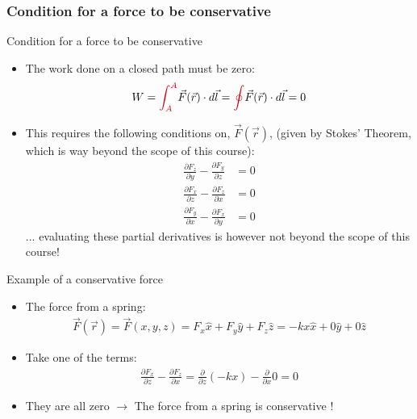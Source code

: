 \documentclass[aspectratio=169,
hyperref={colorlinks,urlcolor=blue}
]{beamer}
\begin{document}


\subsubsection{Condition for a force to be conservative}
\label{subsec:conditionforconservativeforce}
\begin{frame}{Condition for a force to be conservative}
\begin{itemize}
\item The work done on a closed path must be zero:
\begin{align*}
W=\textcolor{myred}{\int_A^A}\vec F(\vec r) \cdot d\vec l = \textcolor{myred}{\oint}\vec F(\vec r) \cdot d\vec l = 0
\end{align*}
\item This requires the following conditions on, $\vec F(\vec r)$, (given by Stokes' Theorem, which is way beyond the scope of this course):
\begin{align*}
\frac{\partial F_z}{\partial y}-\frac{\partial F_y}{\partial z}&=0\\
\frac{\partial F_x}{\partial z}-\frac{\partial F_z}{\partial x}&=0\\
\frac{\partial F_y}{\partial x}-\frac{\partial F_x}{\partial y}&=0
\end{align*}
... evaluating these partial derivatives is however not beyond the scope of this course!
\end{itemize}
\end{frame}


\begin{frame}{Example of a conservative force}
\begin{itemize}
\item The force from a spring:
\begin{align*}
\vec F(\vec r)=\vec F(x,y,z)=F_x \hat x+F_y\hat y+F_z\hat z = -kx\hat x+0\hat y+0\hat z
\end{align*}
\item Take one of the terms:
\begin{align*}
\frac{\partial F_x}{\partial z}-\frac{\partial F_z}{\partial x}=\frac{\partial}{\partial z}( -kx)-\frac{\partial}{\partial x}0=0
\end{align*}
\item They are all zero $\rightarrow$ The force from a spring is conservative !
\end{itemize}
\end{frame}
\end{document}
